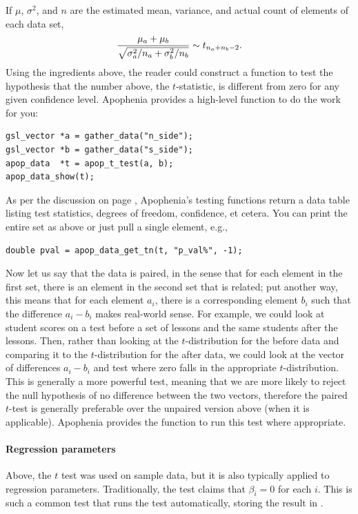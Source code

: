 If $\mu$,
$\sigma^2$, and $n$ are the estimated mean, variance, and actual count
of elements of each data set,
$${\mu_a + \mu_b \over \sqrt{\sigma^2_a/n_a + \sigma^2_b/n_b}} \sim t_{n_a + n_b -2}.$$
Using the ingredients above, the reader could construct a function to
test the hypothesis that the number above, the $t$-statistic, is
different from zero for any given confidence level. Apophenia provides a
high-level function to do the work for you:

\begin{lstlisting}
gsl_vector *a = gather_data("n_side");
gsl_vector *b = gather_data("s_side");
apop_data  *t = apop_t_test(a, b);
apop_data_show(t);
\end{lstlisting}
As per the discussion on page \pageref{testoutput}, Apophenia's testing
functions return a data table listing test statistics, degrees of
freedom, confidence, et cetera. You can print the entire set as above or
just pull a single element, e.g.,
\begin{lstlisting}
double pval = apop_data_get_tn(t, "p_val%", -1);
\end{lstlisting}

Now let us say that the data is paired, in the sense that for each
element in the first set, there is an element in the second set that is
related; put another way, this means that for each element $a_i$, there
is a corresponding element $b_i$ such that the difference $a_i - b_i$
makes real-world sense. For example, we could look at student scores on
a test before a set of lessons and the same students after the lessons.
Then, rather than looking at the $t$-distribution for the before data
and comparing it to the $t$-distribution for the after data, we could
look at the vector of differences $a_i - b_i$ and test where zero falls
in the appropriate $t$-distribution. This is generally a more powerful test,
meaning that we are more likely to reject the null hypothesis of no
difference between the two vectors, therefore the paired $t$-test is
generally preferable over the unpaired version above (when it is
applicable). Apophenia provides the 
function to run this test where appropriate.

\paragraph{Regression parameters} Above, the $t$ test was used on sample
data, but it is also typically applied to regression parameters.
Traditionally, the test claims that $\beta_i=0$ for each $i$. This is
such a common test that  runs
the test automatically, storing the result in
.

